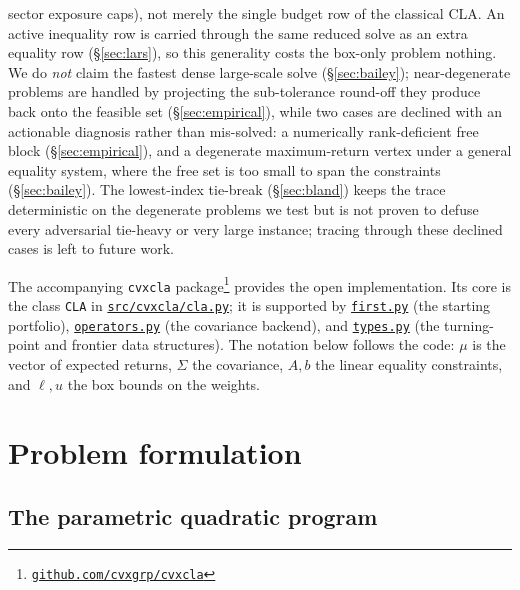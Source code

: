 \documentclass[11pt]{article}
\newcommand{\Sig}{\Sigma}
\newcommand{\lb}{\ell}              %
\newcommand{\ub}{u}                 %
\newcommand{\repourl}{https://github.com/cvxgrp/cvxcla}
\newcommand{\srcref}{v1.8.1}
\newcommand{\srcfile}[2]{\href{\repourl/blob/\srcref/#1}{\texttt{#2}}}
\begin{document}
sector exposure caps), not merely the single budget row of the classical CLA. An
active inequality row is carried through the same reduced solve as an extra equality
row (\S\ref{sec:lars}), so this generality costs the box-only problem nothing.
We do \emph{not} claim the fastest dense large-scale solve
(\S\ref{sec:bailey}); near-degenerate problems are handled by projecting the
sub-tolerance round-off they produce back onto the feasible set
(\S\ref{sec:empirical}), while two cases are declined with an actionable diagnosis
rather than mis-solved: a numerically rank-deficient free block
(\S\ref{sec:empirical}), and a degenerate maximum-return vertex under a general
equality system, where the free set is too small to span the constraints
(\S\ref{sec:bailey}). The lowest-index tie-break (\S\ref{sec:bland}) keeps the
trace deterministic on the degenerate problems we test but is not proven to defuse
every adversarial tie-heavy or very large instance; tracing through these declined
cases is left to future work.

The accompanying \texttt{cvxcla}
package\footnote{\href{\repourl}{\texttt{github.com/cvxgrp/cvxcla}}} provides the
open implementation. Its core is the class \texttt{CLA} in \srcfile{src/cvxcla/cla.py}{src/cvxcla/cla.py}; it is
supported by \srcfile{src/cvxcla/first.py}{first.py} (the starting portfolio),
\srcfile{src/cvxcla/operators.py}{operators.py} (the
covariance backend), and \srcfile{src/cvxcla/types.py}{types.py} (the turning-point and frontier data
structures). The notation below follows the code: $\mu$ is the vector of expected
returns, $\Sig$ the covariance, $A,b$ the linear equality constraints, and $\lb,\ub$ the
box bounds on the weights.

\section{Problem formulation}

\subsection{The parametric quadratic program}
\end{document}
